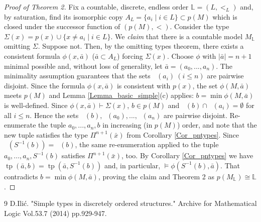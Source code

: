 \documentclass[10pt,a4paper]{amsart}
\theoremstyle{definition}
\DeclareMathOperator{\cl}{cl_S}
\DeclareMathOperator{\tp}{tp}
\begin{document}
\begin{proof}[{\it Proof of Theorem 2}]  Fix a countable, discrete, endless order $\mathbb L=(L,<_L)$ and, by saturation,  find its isomorphic copy $A_L=\{ a_i\mid i\in L\}\subset p(M)$  which is closed under the successor function of $(p(M),<)$. 
Consider the type $\Sigma(x)=p(x)\cup \{x\neq a_i\mid i\in L\}$. We {\it claim} that there is a countable model $M_{\mathbb L}$ omitting $\Sigma$. Suppose not. Then, by the omitting types theorem, there exists a consistent formula $\phi(x, \bar a)$ ($\bar a\subset A_L$) forcing $\Sigma(x)$. Choose $\phi$ with $|\bar a|=n+1$ minimal possible and, without loss of generality, let $\bar a=(a_0,...,a_n)$. 
The minimality assumption guarantees that the sets $\cl(a_i) \ ( i\leq n)$ are pairwise disjoint. Since the formula $\phi(x,\bar a)$ is consistent with $p(x)$, the set $\phi(M,\bar a)$ meets $p(M)$ and Lemma \ref{Lemma_basic_simple}(c) applies:  $b=\min \phi(M,\bar a)$ is well-defined. Since $\phi(x,\bar a)\vdash \Sigma(x)$, $b\in p(M)$ and $\cl(b)\cap \cl(a_i)=\emptyset$ for all $i\leq n$. 
Hence the sets $\cl(b), \cl(a_0),...,\cl(a_{n})$ are pairwise disjoint. Re-enumerate the tuple $a_0,...,a_n,b$ in increasing (in $p(M)$) order, and note that the new tuple satisfies the type $\Pi^{n+1}(\bar x)$ from Corollary \ref{Cor_pntypes}.  
Since $\cl(S^{-1}(b))=\cl(b)$,  the same re-enumeration applied to the tuple $a_0,...,a_n, S^{-1}(b)$ satisfies $\Pi^{n+1}(\bar x)$, too. By Corollary \ref{Cor_pntypes} we have $\tp(\bar a,b)=\tp(\bar a,S^{-1}(b))$ and, in particular, $\models  \phi(S^{-1}(b),\bar a)$. That contradicts $b=\min\phi(M,\bar a)$, proving the claim and Theorem 2 as $p(M_{\mathbb L})\cong \mathbb L$. 
\end{proof}

\begin{thebibliography}{9}
 D.Ili\'c. "Simple types in discretely ordered structures." Archive for Mathematical Logic Vol.53.7 (2014)  pp.929-947.
\end{thebibliography}
\end{document}
